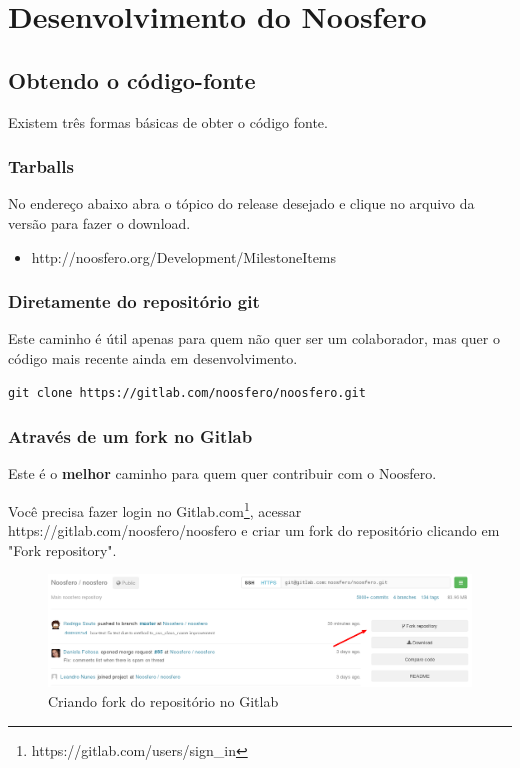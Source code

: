 \documentclass[11pt]{article}
\begin{document}
\section{Desenvolvimento do Noosfero}


\subsection{Obtendo o código-fonte}

Existem três formas básicas de obter o código fonte.

\subsubsection{Tarballs}

No endereço abaixo abra o tópico do release desejado e clique no arquivo da versão
para fazer o download.

\begin{itemize}
  \item http://noosfero.org/Development/MilestoneItems
\end{itemize}

\subsubsection{Diretamente do repositório git}

Este caminho é útil apenas para quem não quer ser um colaborador, mas quer o código
mais recente ainda em desenvolvimento.

\begin{Verbatim}[frame=single,fontfamily=courier]
  git clone https://gitlab.com/noosfero/noosfero.git
\end{Verbatim}

\subsubsection{Através de um fork no Gitlab}

Este é o {\bf melhor} caminho para quem quer contribuir com o Noosfero.

Você precisa fazer login no
Gitlab.com\footnote{https://gitlab.com/users/sign\_in}, acessar
https://gitlab.com/noosfero/noosfero e criar um fork do repositório clicando
em "Fork repository".

\begin{figure}[h]
\center
\includegraphics[scale=0.4]{gitlab-fork.png}
\caption{Criando fork do repositório no Gitlab}
\label{fig:gitlab-fork}
\end{figure}
\end{document}
